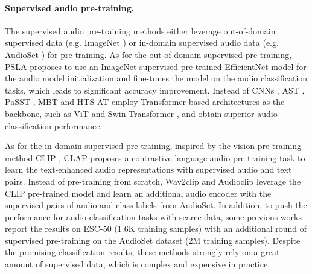 \documentclass{article}
\theoremstyle{plain}
\theoremstyle{definition}
\theoremstyle{remark}
\begin{document}
\paragraph{Supervised audio pre-training.}
The supervised audio pre-training methods either leverage out-of-domain supervised data (e.g. ImageNet \citep{deng2009imagenet}) or in-domain supervised audio data (e.g. AudioSet \citep{gemmeke2017audio}) for pre-training.
As for the out-of-domain supervised pre-training, PSLA \citep{gong2021psla}  proposes to use an ImageNet supervised pre-trained EfficientNet \citep{tan2019efficientnet} model for the audio model initialization and fine-tunes the model on the audio classification tasks, which leads to significant accuracy improvement.
Instead of CNNs \citep{lecun1995convolutional}, AST \citep{gong2021ast}, PaSST \citep{koutini2021efficient}, MBT \citep{nagrani2021attention} and HTS-AT \citep{chen2022hts} employ Transformer-based architectures \citep{vaswani2017attention} as the backbone, such as ViT \citep{vit} and Swin Transformer \citep{liu2021swin},  and obtain superior audio classification performance.

As for the in-domain supervised pre-training, inspired by the vision pre-training method CLIP \citep{radford2021learning}, CLAP \citep{elizalde2022clap} proposes a contrastive language-audio pre-training task to learn the text-enhanced audio representations with supervised audio and text pairs.
Instead of pre-training from scratch, Wav2clip \citep{wu2022wav2clip} and Audioclip \citep{guzhov2022audioclip} leverage the CLIP pre-trained model and learn an additional audio encoder with the supervised pairs of audio and class labels from AudioSet.
In addition, to push the performance for audio classification tasks with scarce data, some previous works \citep{kong2020panns,verbitskiy2022eranns,gong2021ast,chen2022hts,koutini2021efficient,xu2022masked} report the results on ESC-50 (1.6K training samples) with an additional round of supervised pre-training on the AudioSet dataset (2M training samples).
Despite the promising classification results, these methods strongly rely on a great amount of supervised data, which is complex and expensive in practice.
\end{document}
